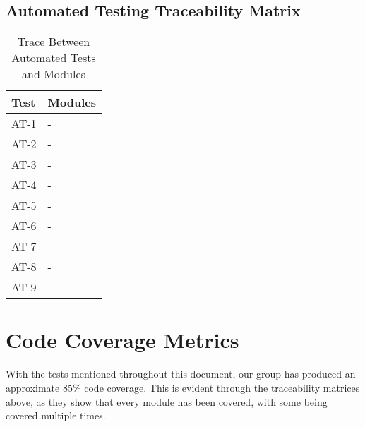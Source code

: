 \documentclass[12pt, titlepage]{article}
\begin{document}
\subsection{Automated Testing Traceability Matrix}
\begin{table}[H]
\centering
\begin{tabular}{p{} p{}}
\toprule
\textbf{Test} & \textbf{Modules}\\
\midrule
AT-1 & -\\
AT-2 & -\\
AT-3 & -\\
AT-4 & -\\
AT-5 & -\\
AT-6 & -\\
AT-7 & -\\
AT-8 & -\\
AT-9 & -\\
\bottomrule
\end{tabular}
\caption{Trace Between Automated Tests and Modules}
\label{TblATM}
\end{table}

\newpage
	
\section{Code Coverage Metrics}					%

With the tests mentioned throughout this document, our group has produced an approximate 85\% code coverage. This is evident through the traceability matrices above, as they show that every module has been covered, with some being covered multiple times.
\end{document}
